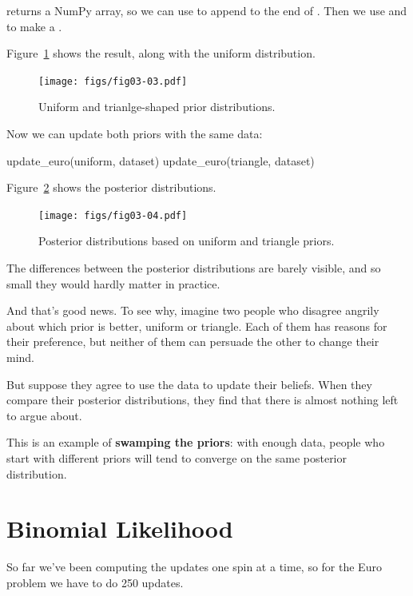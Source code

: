\documentclass[12pt]{book}
\theoremstyle{exercise}
\begin{document}
 returns a NumPy array, so we can use  to append  to the end of .
Then we use  and  to make a .

Figure~\ref{fig03-03} shows the result, along with the uniform distribution.
 
\begin{figure}
\centerline{\texttt{[image: figs/fig03-03.pdf]}}
\caption{Uniform and trianlge-shaped prior distributions.}
\label{fig03-03}
\end{figure}

Now we can update both priors with the same data: 
 
\begin{code}
update_euro(uniform, dataset)
update_euro(triangle, dataset)
\end{code}

Figure~\ref{fig03-04} shows the posterior distributions.

\begin{figure}
\centerline{\texttt{[image: figs/fig03-04.pdf]}}
\caption{Posterior distributions based on uniform and triangle priors.}
\label{fig03-04}
\end{figure}

The differences between the posterior distributions are barely visible, and so small they would hardly matter in practice.

And that's good news.
To see why, imagine two people who disagree angrily about which prior is better, uniform or triangle.
Each of them has reasons for their preference, but neither of them can persuade the other to change their mind.

But suppose they agree to use the data to update their beliefs.
When they compare their posterior distributions, they find that there is almost nothing left to argue about.

This is an example of {\bf swamping the priors}: with enough
data, people who start with different priors will tend to
converge on the same posterior distribution.



\section{Binomial Likelihood}
\label{binomlike}

So far we've been computing the updates one spin at a time, so for the Euro problem we have to do 250 updates.
\end{document}
